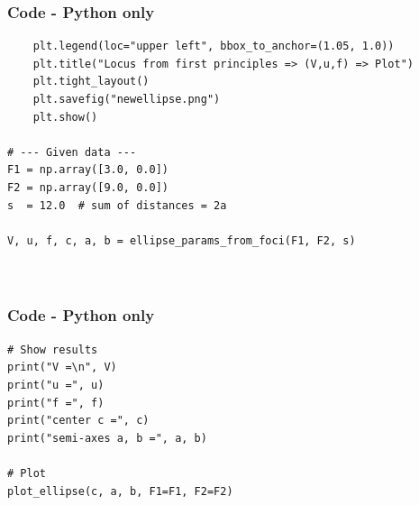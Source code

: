 \documentclass{beamer}
\theoremstyle{remark}
\numberwithin{equation}{section}
\begin{document}
\begin{frame}[fragile]
\frametitle{Code - Python only}
\begin{lstlisting}
    plt.legend(loc="upper left", bbox_to_anchor=(1.05, 1.0))
    plt.title("Locus from first principles => (V,u,f) => Plot")
    plt.tight_layout()
    plt.savefig("newellipse.png")
    plt.show()

# --- Given data ---
F1 = np.array([3.0, 0.0])
F2 = np.array([9.0, 0.0])
s  = 12.0  # sum of distances = 2a

V, u, f, c, a, b = ellipse_params_from_foci(F1, F2, s)



\end{lstlisting}
\end{frame}

\begin{frame}[fragile]
\frametitle{Code - Python only}
\begin{lstlisting}
# Show results
print("V =\n", V)
print("u =", u)
print("f =", f)
print("center c =", c)
print("semi-axes a, b =", a, b)

# Plot
plot_ellipse(c, a, b, F1=F1, F2=F2)

\end{lstlisting}
\end{frame}
\end{document}
